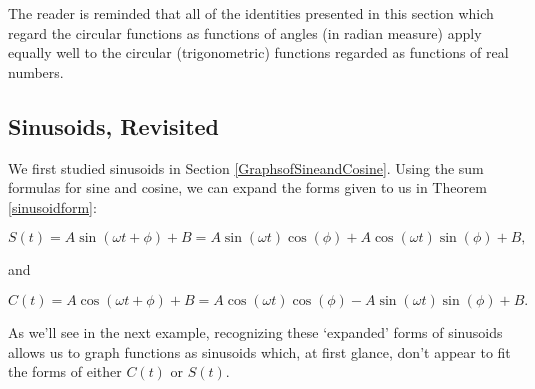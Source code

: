 \documentclass{ximera}
\begin{document}
The reader is reminded that all of the identities presented in this section which regard the circular functions as functions of angles (in radian measure) apply equally well to the circular (trigonometric) functions regarded as functions of real numbers. 

\subsection{Sinusoids, Revisited}
\label{expandedsinusoid}

We first studied sinusoids in Section \ref{GraphsofSineandCosine}.  Using the sum formulas for sine and cosine, we can expand the forms given to us in Theorem \ref{sinusoidform}:


\[ S(t) = A \sin(\omega t + \phi) + B = A\sin(\omega t) \cos(\phi) + A \cos(\omega t)\sin(\phi) + B,\]

and

\[C(t) = A \cos(\omega t + \phi) + B = A\cos(\omega t) \cos(\phi) - A \sin(\omega t) \sin(\phi) + B.\]


As we'll see in the next example, recognizing these `expanded' forms of sinusoids allows  us to graph functions as sinusoids which, at first glance, don't appear to fit the forms of either $C(t)$ or $S(t)$.  
\end{document}
